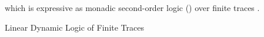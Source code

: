  which is expressive as monadic second-order logic 
(\MSO) over finite traces \cite{de2013linear}.

Linear Dynamic Logic of Finite
Traces

%
%
%

